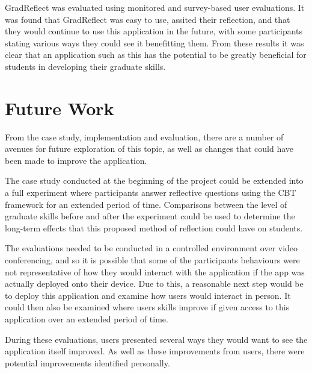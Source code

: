 \documentclass{l4proj}
\begin{document}
GradReflect was evaluated using monitored and survey-based user evaluations. It was found that GradReflect was easy to use, assited their reflection, and that they would continue to use this application in the future, with some participants stating various ways they could see it benefitting them. From these results it was clear that an application such as this has the potential to be greatly beneficial for students in developing their graduate skills.


\section{Future Work} \label{Concl_futureWork}

From the case study, implementation and evaluation, there are a number of avenues for future exploration of this topic, as well as changes that could have been made to improve the application. 

The case study conducted at the beginning of the project could be extended into a full experiment where participants answer reflective questions using the CBT framework for an extended period of time. Comparisons between the level of graduate skills before and after the experiment could be used to determine the long-term effects that this proposed method of reflection could have on students. 

The evaluations needed to be conducted in a controlled environment over video conferencing, and so it is possible that some of the participants behaviours were not representative of how they would interact with the application if the app was actually deployed onto their device. Due to this, a reasonable next step would be to deploy this application and examine how users would interact in person. It could then also be examined where users skills improve if given access to this application over an extended period of time.

During these evaluations, users presented several ways they would want to see the application itself improved. As well as these improvements from users, there were potential improvements identified personally.
\end{document}
